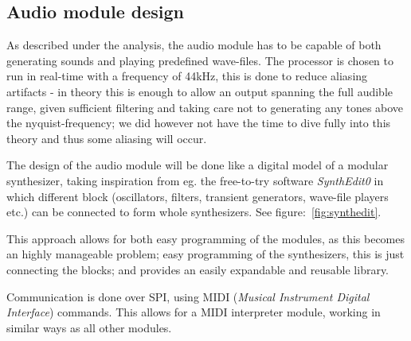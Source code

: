 \subsection{Audio module design}

As described under the analysis, the audio module has to be capable of both
generating sounds and playing predefined wave-files. The processor is chosen to
run in real-time with a frequency of 44kHz, this is done to reduce aliasing
artifacts - in theory this is enough to allow an output spanning the full
audible range, given sufficient filtering and taking care not to generating any
tones above the nyquist-frequency; we did however not have the time to dive
fully into this theory and thus some aliasing will occur.

The design of the audio module will be done like a digital model of a modular
synthesizer, taking inspiration from eg. the free-to-try software
\emph{SynthEdit0} in which different block (oscillators, filters, transient
generators, wave-file players etc.) can be connected to form whole synthesizers.
See figure:~\ref{fig:synthedit}.

This approach allows for both easy programming of the modules, as this becomes
an highly manageable problem; easy programming of the synthesizers, this is just
connecting the blocks; and provides an easily expandable and reusable library.

Communication is done over SPI, using MIDI (\emph{Musical Instrument Digital
Interface}) commands. This allows for a MIDI interpreter module, working in
similar ways as all other modules.

\subsubsection{}





